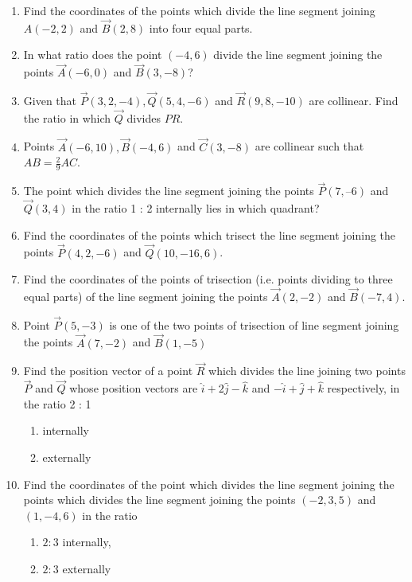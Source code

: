 \begin{enumerate}[label=\thesubsection.\arabic*,ref=\thesubsection.\theenumi]
	\\
		\solution
	
\item Find the coordinates of the points which divide the line segment joining $A(-2,2)$  and  $\vec{B}(2,8)$ into four equal parts.
	\\
		\solution
	
\item In what ratio does the point $(-4,6)$ divide the line segment joining the points $\vec{A}(-6,0)$ and $\vec{B}(3,-8)$?
\item Given that $\vec{P}(3,2,-4), \vec{Q}(5,4,-6)$ and $\vec{R}(9,8,-10)$ are collinear. Find the ratio in which $\vec{Q}$ divides $PR$.
\item Points $\vec{A}(-6,10),\vec{B}(-4,6)$  and  $\vec{C}(3,-8)$ are collinear such that $AB=  \frac{2}{9}AC$.
\item The point which divides the line segment joining the points $\vec{P} (7, –6) $  and  $\vec{Q}(3, 4)$ in the 
ratio 1 : 2 internally lies in  which quadrant?
\item Find the coordinates of the points which trisect the line segment joining the points $\vec{P}(4,2,-6)$ and $\vec{Q}(10,-16,6)$.
\item Find the coordinates of the points of trisection (i.e. points dividing to three equal parts) of the line segment joining the points $\vec{A}(2,-2)$ and $\vec{B}(-7,4)$.
\item Point $\vec{P}(5,-3)$ is one of the two points of trisection of line segment joining the points $\vec{A}(7,-2)$ and $\vec{B}(1,-5)$
\item Find the position vector of a point $\vec{R}$ which divides the line joining two points $\vec{P}$
and $\vec{Q}$ whose position vectors are $\hat{i}+2\hat{j}-\hat{k}$ and $-\hat{i}+\hat{j}+\hat{k}$ respectively, in the
ratio 2 : 1
\begin{enumerate}
    \item  internally
    \item  externally
\end{enumerate}
%		
\item Find the coordinates of the point which divides the line segment joining the points which divides the line segment joining  the points $(-2,3,5)$ and $(1,-4,6)$ in the ratio 
\begin{enumerate}
\item $2:3$ internally,
\item $2:3$ externally

\end{enumerate}
\end{enumerate}
